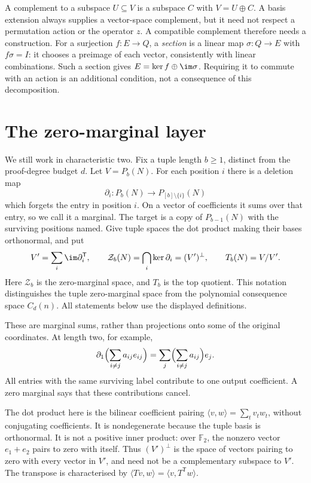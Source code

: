 A complement to a subspace $U\subseteq V$ is a subspace $C$ with
$V=U\oplus C$. A basis extension always supplies a vector-space
complement, but it need not respect a permutation action or the
operator $z$. A compatible complement therefore needs a construction.
For a surjection $f:E\to Q$, a \emph{section} is a linear map
$\sigma:Q\to E$ with $f\sigma=I$: it chooses a preimage of each
vector, consistently with linear combinations. Such a section gives
$E=\ker f\oplus\im\sigma$. Requiring it to commute with an action
is an additional condition, not a consequence of this decomposition.

\section{The zero-marginal layer}\label{tx:sec:layers}
We still work in characteristic two. Fix a tuple length $b\ge1$, distinct from the proof-degree budget $d$. Let $V=P_b(N)$. For each position $i$ there is a deletion map
\[\partial_i:P_b(N)\longrightarrow P_{[b]\setminus\{i\}}(N)
\]
which forgets the entry in position $i$. On a vector of coefficients it sums over that entry, so we call it a marginal. The target is a copy of $P_{b-1}(N)$ with the surviving positions named. Give tuple spaces the dot product making their bases orthonormal, and put
\begin{equation}\label{tx:eq:anatomy}
V'=\sum_i\im\partial_i^{\mathsf T},\qquad
\mathcal Z_b(N)=\bigcap_i\ker\partial_i=(V')^\perp,\qquad T_b(N)=V/V'.
\end{equation}
Here $\mathcal Z_b$ is the zero-marginal space, and $T_b$ is the top quotient. This notation distinguishes the tuple zero-marginal space from the
polynomial consequence space $C_d(n)$. All statements below use the
displayed definitions.

These are marginal sums, rather than projections onto some of the
original coordinates. At length two, for example,
\[
 \partial_1\Bigl(\sum_{i\ne j}a_{ij}e_{ij}\Bigr)
                  =\sum_j\Bigl(\sum_{i\ne j}a_{ij}\Bigr)e_j.
\]
All entries with the same surviving label contribute to one output
coefficient. A zero marginal says that these contributions cancel.

The dot product here is the bilinear coefficient pairing
$\langle v,w\rangle=\sum_t v_t w_t$, without conjugating coefficients.
It is nondegenerate because the tuple basis is orthonormal. It is not
a positive inner product: over $\mathbb F_2$, the nonzero vector
$e_1+e_2$ pairs to zero with itself. Thus $(V')^\perp$ is the space
of vectors pairing to zero with every vector in $V'$, and need not
be a complementary subspace to $V'$. The transpose is characterised
by $\langle Tv,w\rangle=\langle v,T^{\mathsf T}w\rangle$.

